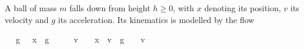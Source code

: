 \documentclass[envcountsame,envcountsect]{llncs}
\begin{document}
\begin{example}\label{ex:ball-hoare}
  A ball of mass $m$ falls down from height $h\geq 0$, with
  $x$ denoting its position, $v$ its velocity and $g$ its
  acceleration. Its kinematics is modelled by the flow
\begin{isabellebody}
\isanewline
{}\ %
{\isachardoublequoteopen}{\isasymphi}\ g\ {\isasymtau}\ {\isasymequiv}\ {\isacharbrackleft}x\ {\isasymmapsto}\ g\ {\isasymcdot}\ {\isasymtau}\ {\isacharcircum}\ {}{\isacharslash}{}\ {\isacharplus}\ v\ {\isasymcdot}\ {\isasymtau}\ {\isacharplus}\ x{\isacharcomma}\ \ v\ {\isasymmapsto}\ g\ {\isasymcdot}\ {\isasymtau}\ {\isacharplus}\ v{\isacharbrackright}{\isachardoublequoteclose}\isanewline
\end{isabellebody}


\end{example}
\end{document}

